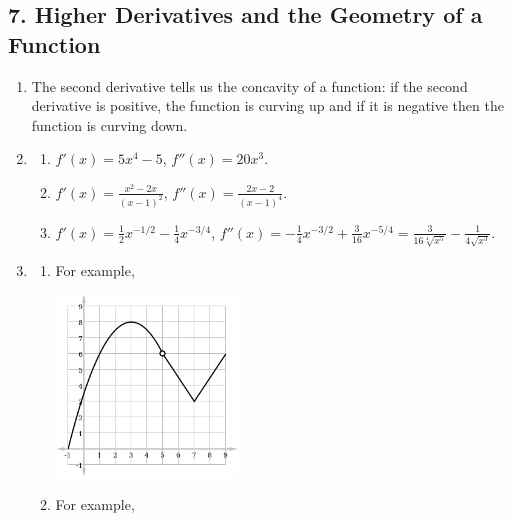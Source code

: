 \subsection*{7. Higher Derivatives and the Geometry of a Function}
\begin{enumerate}
  \item The second derivative tells us the concavity of a function: if the second derivative is positive, the function is curving up
        and if it is negative then the function is curving down.
  \item
    \begin{enumerate}
      \item $ f'(x) = 5x^4 - 5 $, $ f''(x) = 20x^3 $.
      \item $ f'(x) = \frac{x^2 - 2x}{(x - 1)^2} $, $ f''(x) = \frac{2x - 2}{(x - 1)^4} $.
      \item $ f'(x) = \frac{1}{2} x^{-1/2} - \frac{1}{4} x^{-3/4} $,
            $ f''(x) = -\frac{1}{4} x^{-3/2} + \frac{3}{16}x^{-5/4} = \frac{3}{16\sqrt[4]{x^5}} - \frac{1}{4\sqrt{x^3}} $.
    \end{enumerate}
  \item
    \begin{enumerate}
      \item For example,

            \begin{center}
              \includegraphics[width=0.4\textwidth]{function}
            \end{center}

      \item For example,

        \begin{center}
        \end{center}

    \end{enumerate}
\end{enumerate}

